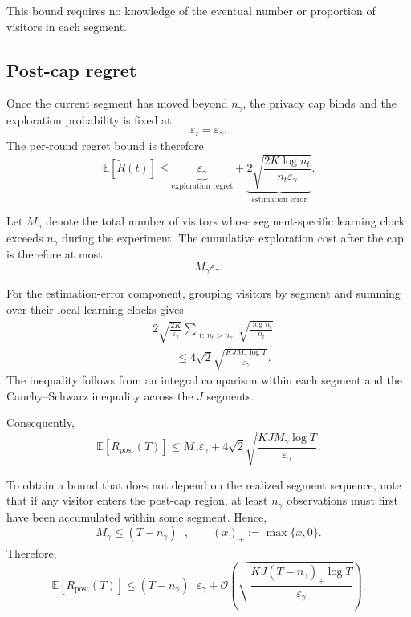 \documentclass[mksc,nonblindrev]{informs3}
\begin{document}
\begin{APPENDICES}
This bound requires no knowledge of the eventual number or proportion of visitors in each segment.

\subsection{Post-cap regret}

Once the current segment has moved beyond \(n_\gamma\), the privacy cap binds and the exploration probability is fixed at
\[
\varepsilon_t=\varepsilon_\gamma.
\]
The per-round regret bound is therefore
\begin{equation}
\label{eq:postcap-perround}
\mathbb E[\widetilde R(t)]
\leq
\underbrace{\varepsilon_\gamma}_{\text{exploration regret}}
+
\underbrace{
2\sqrt{
\frac{2K\log n_t}
{n_t\varepsilon_\gamma}
}
}_{\text{estimation error}}.
\end{equation}

Let \(M_\gamma\) denote the total number of visitors whose segment-specific learning clock exceeds \(n_\gamma\) during the experiment. The cumulative exploration cost after the cap is therefore at most
\[
M_\gamma\varepsilon_\gamma.
\]

For the estimation-error component, grouping visitors by segment and summing over their local learning clocks gives
\begin{align}
&
2\sqrt{\frac{2K}{\varepsilon_\gamma}}
\sum_{\substack{t:\,n_t>n_\gamma}}
\sqrt{\frac{\log n_t}{n_t}}
\nonumber\\
&\qquad\leq
4\sqrt{2}
\sqrt{
\frac{KJ M_\gamma\log T}
{\varepsilon_\gamma}
}.
\label{eq:postcap-estimation}
\end{align}
The inequality follows from an integral comparison within each segment and the Cauchy--Schwarz inequality across the \(J\) segments.

Consequently,
\begin{equation}
\label{eq:postcap-regret}
\mathbb E[R_{\mathrm{post}}(T)]
\leq
M_\gamma\varepsilon_\gamma
+
4\sqrt{2}
\sqrt{
\frac{KJ M_\gamma\log T}
{\varepsilon_\gamma}
}.
\end{equation}

To obtain a bound that does not depend on the realized segment sequence, note that if any visitor enters the post-cap region, at least \(n_\gamma\) observations must first have been accumulated within some segment. Hence,
\[
M_\gamma
\leq
(T-n_\gamma)_+,
\qquad
(x)_+:=\max\{x,0\}.
\]
Therefore,
\begin{equation}
\label{eq:postcap-regret-simple}
\mathbb E[R_{\mathrm{post}}(T)]
\leq
(T-n_\gamma)_+\varepsilon_\gamma
+
\mathcal O\left(
\sqrt{
\frac{
KJ(T-n_\gamma)_+\log T
}{
\varepsilon_\gamma
}
}
\right).
\end{equation}


\end{APPENDICES}
\end{document}
